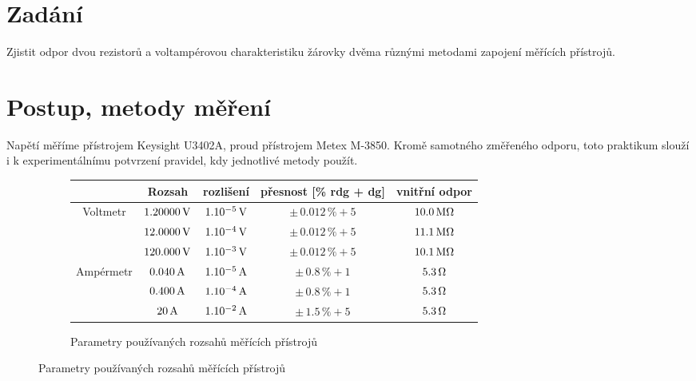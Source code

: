 \documentclass[czech,11pt,a4paper]{article}
\begin{document}
	
	\section{Zadání}
	Zjistit odpor dvou rezistorů a voltampérovou charakteristiku žárovky dvěma různými metodami zapojení měřících přístrojů.
	
	\section{Postup, metody měření}
	Napětí měříme přístrojem Keysight U3402A, proud přístrojem Metex M-3850. Kromě samotného změřeného odporu, toto praktikum slouží i k experimentálnímu potvrzení pravidel, kdy jednotlivé metody použít.
	
	\begin{figure} [h]
		\begin{subfigure}{1\textwidth}
			\begin{center}
				
			\begin{tabular}{||c|c|c|c|c||}
				\hline
				& Rozsah & rozlišení & přesnost [\% rdg + dg] & vnitřní odpor\\
				\hline
				\multirow {3}{*}{Voltmetr} &$1.20000 \,\rm V $& $1 . 10^{-5} \,\rm V$  & $\pm \, 0.012\, \%   +5$ & $10.0 \,\rm M \Omega$ \\
				
				& $12.0000 \,\rm V $& $1 . 10^{-4} \,\rm V$  & $\pm \, 0.012 \, \%   +5$ & $11.1 \,\rm M \Omega$\\
				
				
				& $120.000 \,\rm V $& $1 . 10^{-3} \,\rm V$  & $\pm \, 0.012 \, \%   +5$ & $10.1 \,\rm M \Omega$\\
				\hline
				\multirow {2}{*}{Ampérmetr} &$0.040 \,\rm A $& $1 . 10^{-5} \,\rm A$  & $\pm \, 0.8\, \%   +1$ & $5.3 \,\rm  \Omega$ \\
				&$0.400 \,\rm A $& $1 . 10^{-4} \,\rm A$  & $\pm \, 0.8\, \%   +1$ & $5.3 \,\rm  \Omega$ \\
				
				& $20 \,\rm  A$& $1 . 10^{-2} \,\rm A$  & $\pm \, 1.5 \, \%   +5 $ & $5.3 \,\rm  \Omega$\\
				\hline
				
			\end{tabular}
			\end{center}
			
			\caption*{Parametry používaných rozsahů měřících přístrojů}
		\end{subfigure}
	\end{figure}
	\newpage
	
\end{document}
